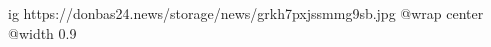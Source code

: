  
 
 
 
 

\ifcmt
  ig https://donbas24.news/storage/news/grkh7pxjssmmg9sb.jpg
  @wrap center
  @width 0.9
\fi
